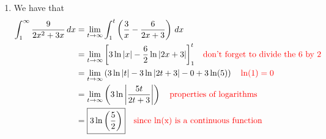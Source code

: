 \documentclass{ximera}
\begin{document}
\begin{problem}
\begin{enumerate}
\begin{freeResponse}
\begin{enumerate}
		
		
	\item We have that
		\begin{align*}
		\int_1^\infty \frac{9}{2x^2+3x} \,d x &= \lim_{t \to \infty} \int_1^t \left( \frac{3}{x} - \frac{6}{2x+3} \right) \,d x  \\
		&= \lim_{t \to \infty} \bigg[ 3\ln|x| - \frac{6}{2} \ln|2x+3| \bigg]_1^t  \quad {\color{red}\text{don't forget to divide the 6 by 2}}  \\
		&= \lim_{t \to \infty} \left( 3\ln|t| - 3\ln|2t+3| - 0 + 3\ln(5) \right)  \quad {\color{red}\ln(1) = 0} \\
		&= \lim_{t \to \infty} \left( 3 \ln \left| \frac{5t}{2t+3} \right| \right)  \quad {\color{red}\text{properties of logarithms}}  \\
		&= \boxed{3 \ln \left( \frac{5}{2} \right)}	\quad	{\color{red}\text{since ln(x) is a continuous function}}
		\end{align*}
	
	\end{enumerate}
	\end{freeResponse}
	
	\end{enumerate}
	
		
\end{problem}
\end{document}
